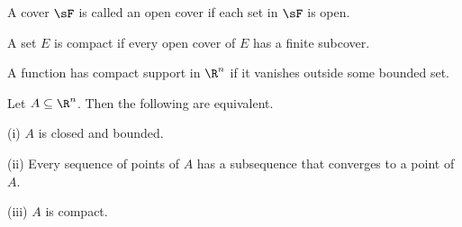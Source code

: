 \begin{definition}
A cover $\sF$ is called an open cover if each set in $\sF$ is open.
\end{definition}

\begin{definition}
A set $E$ is compact if every open cover of $E$ has a finite subcover.
\end{definition}

\begin{definition}
A function has compact support in $\R^n$ if it vanishes outside some bounded set.
\end{definition}




\begin{theorem}\label{thm:heine_borel_compact_real_n_closed_bounded}
Let $A \subseteq \R^n$. Then the following are equivalent.
\ben
\item [(i)] $A$ is closed and bounded.
\item [(ii)] Every sequence of points of $A$ has a subsequence that converges to a point of $A$.
\item [(iii)] $A$ is compact.
\een
\end{theorem}




